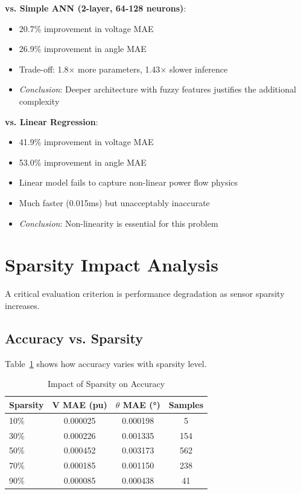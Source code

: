 \documentclass[12pt,a4paper]{report}
\begin{document}
\textbf{vs. Simple ANN (2-layer, 64-128 neurons)}:
\begin{itemize}
    \item 20.7\% improvement in voltage MAE
    \item 26.9\% improvement in angle MAE
    \item Trade-off: 1.8$\times$ more parameters, 1.43$\times$ slower inference
    \item \textit{Conclusion}: Deeper architecture with fuzzy features justifies the additional complexity
\end{itemize}

\textbf{vs. Linear Regression}:
\begin{itemize}
    \item 41.9\% improvement in voltage MAE
    \item 53.0\% improvement in angle MAE
    \item Linear model fails to capture non-linear power flow physics
    \item Much faster (0.015ms) but unacceptably inaccurate
    \item \textit{Conclusion}: Non-linearity is essential for this problem
\end{itemize}

\section{Sparsity Impact Analysis}

A critical evaluation criterion is performance degradation as sensor sparsity increases.

\subsection{Accuracy vs. Sparsity}

Table~\ref{tab:sparsity_impact} shows how accuracy varies with sparsity level.

\begin{table}[ht]
\centering
\caption{Impact of Sparsity on Accuracy}
\label{tab:sparsity_impact}
\begin{tabular}{lccc}
\toprule
\textbf{Sparsity} & \textbf{V MAE (pu)} & \textbf{$\theta$ MAE (°)} & \textbf{Samples} \\
\midrule
10\% & 0.000025 & 0.000198 & 5 \\
30\% & 0.000226 & 0.001335 & 154 \\
50\% & 0.000452 & 0.003173 & 562 \\
70\% & 0.000185 & 0.001150 & 238 \\
90\% & 0.000085 & 0.000438 & 41 \\
\bottomrule
\end{tabular}
\end{table}
\end{document}

